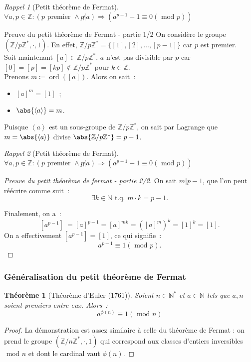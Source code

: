 \documentclass[10pt, mathserif]{beamer}
\DeclareMathOperator{\ord}{ord}
\newcommand{\tq}{\text{ t.q. }}
\newcommand{\Z}{\mathbb Z}
\newcommand{\N}{\mathbb N}
\newcommand{\eng}[1]{\left\langle#1\right\rangle}
\renewcommand{\mod}{\mbox{ mod }}
\newtheorem{thm}{Théorème}[section]
\theoremstyle{definition}
\theoremstyle{remark}
\newtheorem*{rap}{Rappel}
\begin{document}
	\begin{frame}
		\begin{rap}[Petit théorème de Fermat]
			$\forall a, p \in \Z : (p \text{ premier } \land p \not | a) \Rightarrow (a^{p-1} -1 \equiv 0 (\mod p))$
		\end{rap}

		\begin{block}{Preuve du petit théorème de Fermat - partie 1/2}
			On considère le groupe $\left(\Z/p\Z^*, \cdot, 1\right)$. En effet, $\Z/p\Z^* = \{[1], [2], \dotsc, [p-1]\}$ car $p$ est premier. \\
			Soit maintenant $[a] \in \Z/p\Z^*$. $a$ n'est pas divisible par $p$ car $[0] = [p] = [kp] \not \in \Z/p\Z^*$ pour $k \in \Z$. \\
			Prenons $m \coloneqq \ord([a])$. Alors on sait~:
			\begin{itemize}
				\item $[a]^m = [1]$~;
				\item $\abs{\eng a} = m$.
			\end{itemize}

			Puisque $\eng a$ est un sous-groupe de $\Z/p\Z^*$, on sait par Lagrange que $m = \abs{\eng a}$ divise $\abs{\Z/p\Z^*} = p-1$.
		\end{block}
	\end{frame}

	\begin{frame}
		\begin{rap}[Petit théorème de Fermat]
			$\forall a, p \in \Z : (p \text{ premier } \land p \not | a) \Rightarrow (a^{p-1} -1 \equiv 0 (\mod p))$
		\end{rap}

		\begin{proof}[Preuve du petit théorème de fermat - partie 2/2]
			On sait $m | p-1$, que l'on peut réécrire comme suit~:
			\[\exists k \in \N \tq m \cdot k = p-1.\]

			Finalement, on a~:
			\[\left[a^{p-1}\right]\ = [a]^{p-1} = [a]^{mk} = \left([a]^m\right)^k = [1]^k = [1].\]
			On a effectivement $\left[a^{p-1}\right] = [1]$, ce qui signifie~:
			\[a^{p-1} \equiv 1 (\mod p).\]
		\end{proof}
	\end{frame}

	\begin{frame}
		\frametitle{Généralisation du petit théorème de Fermat}

		\begin{thm}[Théorème d'Euler (1761)]
			Soient $n \in \N^*$ et $a \in \N$ tels que $a, n$ soient premiers entre eux. Alors~:
			\[a^{\phi(n)} \equiv 1 (\mod n)\]
		\end{thm}

		\begin{proof}
			La démonstration est assez similaire à celle du théorème de Fermat : on prend le groupe $(\Z/n\Z^*, \cdot, 1)$ qui correspond aux classes
			d'entiers inversibles $\mod n$ et dont le cardinal vaut $\phi(n)$.
		\end{proof}
	\end{frame}
\end{document}
